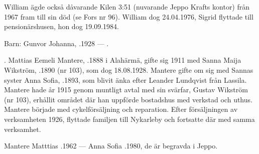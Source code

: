 William ägde också dåvarande Kilen 3:51 (nuvarande Jeppo Krafts kontor) från 1967 fram till sin död (se Fors nr 96). William dog 24.04.1976, Sigrid flyttade till pensionärshusen, hon dog 19.09.1984.

Barn: Gunvor Johanna, .1928 ---  .


%
                    .
Mattias Eemeli Mantere, .1888 i Alahärmä, gifte sig 1911 med Sanna Maija Wikström, .1890 (nr 103), som dog 18.08.1928. Mantere gifte om sig med Sannas syster Anna Sofia, .1893, som blivit änka efter Leander Lundqvist från Lassila. Mantere hade år 1915 genom  muntligt avtal med sin svärfar, Gustav Wikström (nr 103), erhållit området där han uppförde bostadshus med verkstad och uthus. Mantere började med cykelförsäljning och reparation. Efter försäljningen av verksamheten 1926, flyttade familjen till Nykarleby och fortsatte där med samma verksamhet.
\begin{jhchildren}
  \item {}
  \item {}
  \item {}
  \item {}
  \item {}
  \item {}
  \item {}
  \item {}
\end{jhchildren}

Mantere Matttias .1962  ---  Anna Sofia .1980, de är begravda i Jeppo.



%



